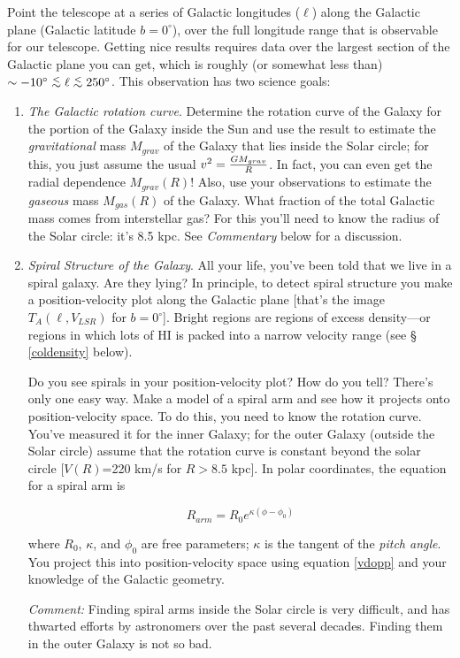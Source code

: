 \documentclass[preprint]{aastex}
\begin{document}
	Point the telescope at a series of Galactic longitudes ($\ell$)
along the Galactic plane (Galactic latitude $b = 0^\circ$), over the
full longitude range that is observable for our telescope.  Getting nice
results requires data over the largest section of the Galactic plane you
can get, which is roughly (or somewhat less than) $\sim -10^\circ \simlt
\ell \simlt 250^\circ$. This observation has two science goals:
\begin{enumerate}

	\item {\it The Galactic rotation curve}. Determine the rotation
curve of the Galaxy for the portion of the Galaxy inside the Sun and use
the result to estimate the {\it gravitational} mass $M_{grav}$ of the
Galaxy that lies inside the Solar circle; for this, you just assume the
usual $v^2 = {G M_{grav} \over R}$.  In fact, you can even get the
radial dependence $M_{grav}(R)$! Also, use your observations to estimate
the {\it gaseous} mass $M_{gas}(R)$ of the Galaxy.  What fraction of the
total Galactic mass comes from interstellar gas? For this you'll need to
know the radius of the Solar circle: it's 8.5 kpc.  See {\it Commentary}
below for a discussion. 

	\item {\it Spiral Structure of the Galaxy}.  All your life,
you've been told that we live in a spiral galaxy.  Are they lying? In
principle, to detect spiral structure you make a position-velocity plot
along the Galactic plane [that's the image $T_A(\ell,V_{LSR})$ for
$b=0^\circ$].  Bright regions are regions of excess density---or regions in
which lots of HI is packed into a narrow velocity range (see \S
\ref{coldensity} below). 

	Do you see spirals in your position-velocity plot? How do you
tell? There's only one easy way.  Make a model of a spiral arm and see
how it projects onto position-velocity space.  To do this, you need to
know the rotation curve.  You've measured it for the inner Galaxy; for
the outer Galaxy (outside the Solar circle) assume that the rotation
curve is constant beyond the solar circle [$V(R)$=220 km/s for $R > 8.5$
kpc].  In polar coordinates, the equation for a spiral arm is

\begin{equation}
R_{arm}  =  R_0 e^ {\kappa (\phi - \phi_0)} 
\end{equation}

\noindent where $R_0$, $\kappa$, and $\phi_0$ are free parameters;
$\kappa$ is the tangent of the {\it pitch angle}.  You project this into
position-velocity space using equation \ref{vdopp} and your knowledge of
the Galactic geometry.  

{\it Comment:} Finding spiral arms inside the Solar circle is very
difficult, and has thwarted efforts by astronomers over the past several
decades. Finding them in the outer Galaxy is not so bad.

\end{enumerate}
\end{document}
